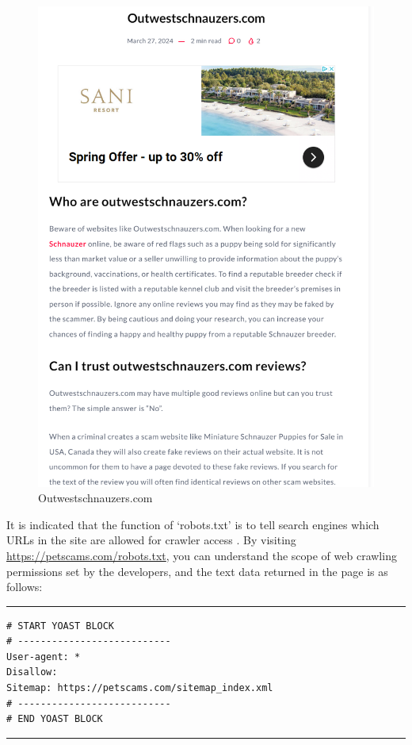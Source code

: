 \documentclass[ oneside,%
                    author={Cassie Qing Tang},
                    degree={BSc},
                     title={An Automated Response System for Disrupting Online Pet Scamming \\ },
                    subtitle={ }]{dissertation}
\begin{document}
\begin{figure}[H]
    \begin{minipage}{0.45\textwidth}
        \includegraphics[width=\linewidth]{pic/figure3.png}
        \caption{Outwestschnauzers.com}
        \label{fig:pic3}
    \end{minipage}
\end{figure}


It is indicated that the function of ‘robots.txt’ is to tell search engines which URLs in the site are allowed for crawler access \cite{noauthor_robotstxt_nodate}. By visiting \url{https://petscams.com/robots.txt}, you can understand the scope of web crawling permissions set by the developers, and the text data returned in the page is as follows:
\vspace{10pt}
\noindent\hrule  
\begin{Verbatim}[fontsize=\small]
# START YOAST BLOCK
# ---------------------------
User-agent: *
Disallow:
Sitemap: https://petscams.com/sitemap_index.xml
# ---------------------------
# END YOAST BLOCK
\end{Verbatim}
\hrule  
\vspace{10pt}
\end{document}
